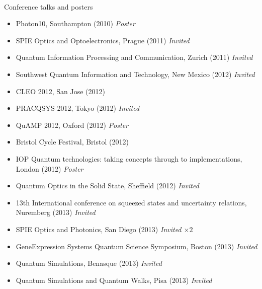 \newpage
~\\
\vspace{00pt}
{\Large \sc Conference talks and posters\\ \rm}
\vspace{15pt}
{\renewcommand\labelitemi{}
\begin{itemize}[leftmargin=0pt]
\item Photon10, Southampton (2010) \emph{Poster}
\item SPIE Optics and Optoelectronics, Prague (2011) \textit{Invited}
\item Quantum Information Processing and Communication, Zurich (2011) \textit{Invited}
\item Southwest Quantum Information and Technology, New Mexico (2012) \textit{Invited}
\item CLEO 2012, San Jose (2012)
\item PRACQSYS 2012, Tokyo (2012) \textit{Invited}
\item QuAMP 2012, Oxford (2012) \textit{Poster}
\item Bristol Cycle Festival, Bristol (2012)
\item IOP Quantum technologies: taking concepts through to implementations, London (2012) \textit{Poster}
\item Quantum Optics in the Solid State, Sheffield (2012) \textit{Invited}
\item 13th International conference on squeezed states and uncertainty relations, Nuremberg (2013) \textit{Invited}
\item SPIE Optics and Photonics, San Diego (2013) \textit{Invited $\times 2$ }
\item GeneExpression Systems Quantum Science Symposium, Boston (2013) \textit{Invited}
\item Quantum Simulations, Benasque (2013) \textit{Invited}
\item Quantum Simulations and Quantum Walks, Pisa (2013) \textit{Invited}
\end{itemize}
}
